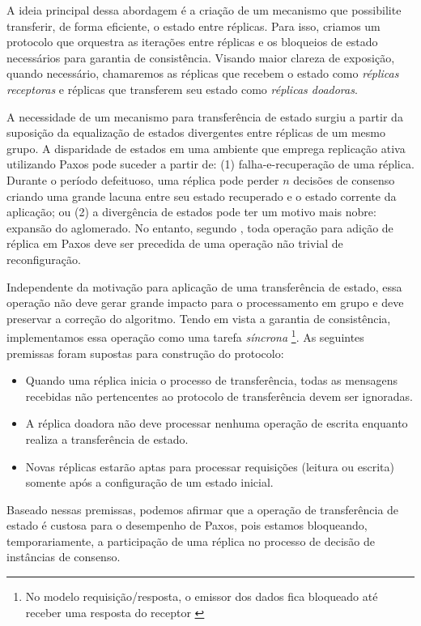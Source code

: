 A ideia principal dessa abordagem é a criação de um mecanismo que possibilite transferir, de
forma eficiente, o estado entre réplicas. Para isso, criamos um protocolo que orquestra as
iterações entre réplicas e os bloqueios de estado necessários para garantia de
consistência. Visando maior clareza de exposição, quando necessário, chamaremos as
réplicas que recebem o estado como \emph{réplicas receptoras} e réplicas que transferem
seu estado como \emph{réplicas doadoras}.

A necessidade de um mecanismo para transferência de estado surgiu a partir da suposição da
equalização de estados divergentes entre réplicas de um mesmo grupo. A disparidade de
estados em uma ambiente que emprega replicação ativa utilizando Paxos pode suceder a
partir de: (1) falha-e-recuperação de uma réplica. Durante o período defeituoso, uma
réplica pode perder $n$ decisões de consenso criando uma grande lacuna entre seu estado
recuperado e o estado corrente da aplicação; ou (2) a divergência de estados pode ter um
motivo mais nobre: expansão do aglomerado. No entanto, segundo ,
toda operação para adição de réplica em Paxos deve ser precedida de uma operação não
trivial de reconfiguração.

Independente da motivação para aplicação de uma transferência de estado, essa operação
não deve gerar grande impacto para o processamento em grupo e deve preservar a correção do
algoritmo. Tendo em vista a garantia de consistência, implementamos essa operação como uma
tarefa \emph{síncrona} \footnote{No modelo requisição/resposta, o emissor dos dados fica
bloqueado até receber uma resposta do receptor \cite{coulouris11}}. As seguintes premissas
foram supostas para construção do protocolo:

\begin{itemize}
  \item Quando uma réplica inicia o processo de transferência, todas as mensagens
    recebidas não pertencentes ao protocolo de transferência devem ser ignoradas.
  \item A réplica doadora não deve processar nenhuma operação de escrita enquanto realiza
    a transferência de estado.
  \item Novas réplicas estarão aptas para processar requisições (leitura ou escrita)
    somente após a configuração de um estado inicial.
\end{itemize}

Baseado nessas premissas, podemos afirmar que a operação de transferência de estado é
custosa para o desempenho de Paxos, pois estamos bloqueando, temporariamente, a
participação de uma réplica no processo de decisão de instâncias de consenso.


